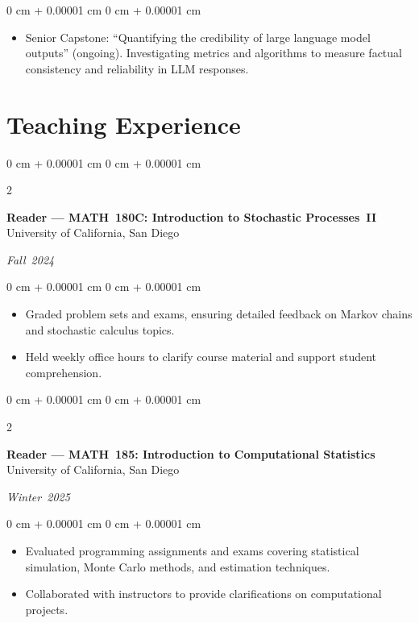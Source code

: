 \documentclass[10pt, letterpaper]{article}
\newenvironment{highlights}{
    \begin{itemize}[
        topsep=0.10 cm,
        parsep=0.10 cm,
        partopsep=0pt,
        itemsep=0pt,
        leftmargin=0 cm + 10pt
    ]
}{
    \end{itemize}
} %
\newenvironment{onecolentry}{
    \begin{adjustwidth}{
        0 cm + 0.00001 cm
    }{
        0 cm + 0.00001 cm
    }
}{
    \end{adjustwidth}
} %
\newenvironment{twocolentry}[2][]{
    \onecolentry
    \def\secondColumn{#2}
    \setcolumnwidth{\fill, 4.5 cm}
    \begin{paracol}{2}
}{
    \switchcolumn \raggedleft \secondColumn
    \end{paracol}
    \endonecolentry
} %
\begin{document}
    \vspace{0.10 cm}
    \begin{onecolentry}
        \begin{highlights}
            \item Senior Capstone: “Quantifying the credibility of large language model outputs” (ongoing). Investigating metrics and algorithms to measure factual consistency and reliability in LLM responses.
        \end{highlights}
    \end{onecolentry}

    \section{Teaching Experience}

    \begin{twocolentry}{\textit{Fall 2024}}
        \textbf{Reader — MATH 180C: Introduction to Stochastic Processes II} \\
        University of California, San Diego
    \end{twocolentry}

    \vspace{0.10 cm}
    \begin{onecolentry}
        \begin{highlights}
            \item Graded problem sets and exams, ensuring detailed feedback on Markov chains and stochastic calculus topics.
            \item Held weekly office hours to clarify course material and support student comprehension.
        \end{highlights}
    \end{onecolentry}

    \vspace{0.15 cm}

    \begin{twocolentry}{\textit{Winter 2025}}
        \textbf{Reader — MATH 185: Introduction to Computational Statistics} \\
        University of California, San Diego
    \end{twocolentry}

    \vspace{0.10 cm}
    \begin{onecolentry}
        \begin{highlights}
            \item Evaluated programming assignments and exams covering statistical simulation, Monte Carlo methods, and estimation techniques.
            \item Collaborated with instructors to provide clarifications on computational projects.
        \end{highlights}
    \end{onecolentry}
\end{document}
